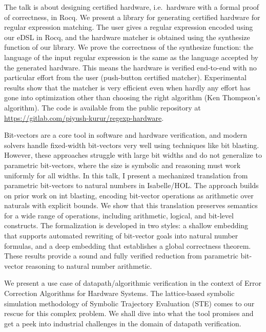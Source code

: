 \documentclass[a4paper,UKenglish]{dagrep-v2021}
\begin{document}
The talk is about designing certified hardware, i.e.\ hardware with a formal proof of correctness, in Rocq. We present a library for generating certified hardware for regular expression matching. The user gives a regular expression encoded using our eDSL in Rocq, and the hardware matcher is obtained using the synthesize function of our library. We prove the correctness of the synthesize function: the language of the input regular expression is the same as the language accepted by the generated hardware. This means the hardware is verified end-to-end with no particular effort from the user (push-button certified matcher). Experimental results show that the matcher is very efficient even when hardly any effort has gone into optimization other than choosing the right algorithm (Ken Thompson's algorithm). The code is available from the public repository at \url{https://gitlab.com/piyush-kurur/regexp-hardware}.


Bit-vectors are a core tool in software and hardware verification, and modern solvers handle fixed-width bit-vectors very well using techniques like bit blasting. However, these approaches struggle with large bit widths and do not generalize to parametric bit-vectors, where the size is symbolic and reasoning must work uniformly for all widths. In this talk, I present a mechanized translation from parametric bit-vectors to natural numbers in Isabelle/HOL. The approach builds on prior work on int blasting, encoding bit-vector operations as arithmetic over naturals with explicit bounds. We show that this translation preserves semantics for a wide range of operations, including arithmetic, logical, and bit-level constructs. The formalization is developed in two styles: a shallow embedding that supports automated rewriting of bit-vector goals into natural number formulas, and a deep embedding that establishes a global correctness theorem. These results provide a sound and fully verified reduction from parametric bit-vector reasoning to natural number arithmetic.


We present a use case of datapath/algorithmic verification in the context of Error Correction Algorithms for Hardware Systems. The lattice-based symbolic simulation methodology of Symbolic Trajectory Evaluation (STE) comes to our rescue for this complex problem. We shall dive into what the tool promises and get a peek into industrial challenges in the domain of datapath verification.
\end{document}
